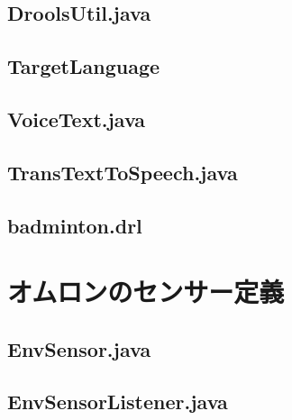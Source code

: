 \documentclass{kuisthesis}			%
\begin{document}
\subsection{DroolsUtil.java}


\subsection{TargetLanguage}


\subsection{VoiceText.java}


\subsection{TransTextToSpeech.java}


\subsection{badminton.drl}


\section{オムロンのセンサー定義}
\subsection{EnvSensor.java}


\subsection{EnvSensorListener.java}

\end{document}
